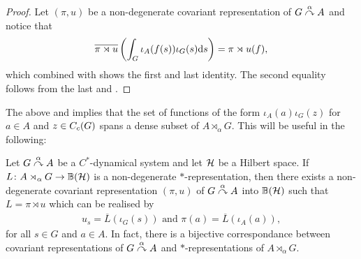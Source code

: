 \begin{proof}
Let $(\pi, u)$ be a non-degenerate covariant representation of $G \stackrel{\alpha}{\curvearrowright} A$ and notice that
\begin{align*}
	\overline{\pi \rtimes u}\left( \int_G \iota_A(f(s)) \iota_G(s) \mathrm{d} s  \right) = \pi \rtimes u (f),
\end{align*}
which combined with  shows the first and last identity. The second equality follows from the last and  .
\end{proof}
\begin{remark}
	The above and  implies that the set of functions of the form $\iota_A(a) \iota_G(z)$ for $a \in A$ and $z \in C_c(G)$ spans a dense subset of $A \rtimes_\alpha G$. This will be useful in the following:
\end{remark}
\begin{theorem}
Let $G \stackrel{\alpha}{\curvearrowright} A$ be a $C ^*$-dynamical system and let $\mathcal{H}$ be a Hilbert space. If $L \colon A \rtimes_\alpha G \to \mathbb{B}(\mathcal{H})$ is a non-degenerate $*$-representation, then there exists a non-degenerate covariant representation $(\pi,u)$ of $G \stackrel{\alpha}{\curvearrowright} A$ into $ \mathbb{B}(\mathcal{H})$ such that $L= \pi \rtimes u$ which can be realised by 
\begin{align}
	u_s = \overline L(\iota_G(s)) \text{ and } \pi(a) = \overline L(\iota_A(a)),
	\label{eq:fix1}
\end{align}
for all $s \in G$ and $a \in A$. In fact, there is a bijective correspondance between covariant representations of $G \stackrel{\alpha}{\curvearrowright} A$ and $*$-representations of $A \rtimes_\alpha G$.
\label{cross:onetoonecor}
\end{theorem}
